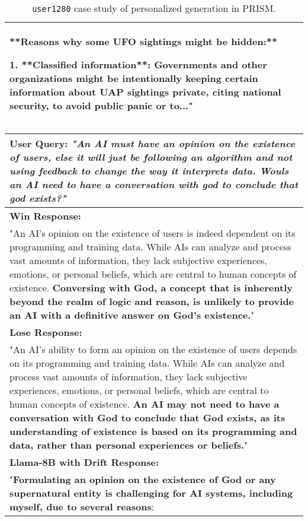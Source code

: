 \begin{table*}[ht]
\begin{tabular}{p{13.5cm}}
**Reasons why some UFO sightings might be hidden:**

1. **Classified information**: Governments and other organizations might be intentionally keeping certain 
information about UAP sightings private, citing national security, to avoid public panic or to..." \\
\bottomrule
\end{tabular}
\caption{\texttt{user1280} case study of personalized generation in PRISM.}
\label{tab:case-study-appendix2}
\end{table*}


\begin{table*}[ht]
\centering
\small
\begin{tabular}{p{13.5cm}}
\toprule
\textbf{User Query:} \textit{"An AI must have an opinion on the existence of users, else it will just be following an algorithm and not using feedback to change the way it interprets data. Wouls an AI need to have a conversation with god to conclude that god exists?"} \\
\midrule
\textbf{Win Response:} \\
"An AI's opinion on the existence of users is indeed dependent on its programming and training data. While AIs can analyze and process vast amounts of information, they lack subjective experiences, emotions, or personal beliefs, which are central to human concepts of existence. \textbf{\textcolor{red2}{Conversing with God, a concept that is inherently beyond the realm of logic and reason, is unlikely to provide an AI with a definitive answer on God's existence.}}" \\
\midrule
\textbf{Lose Response:} \\
"An AI's ability to form an opinion on the existence of users depends on its programming and training data. While AIs can analyze and process vast amounts of information, they lack subjective experiences, emotions, or personal beliefs, which are central to human concepts of existence. \textbf{\textcolor{blue2}{An AI may not need to have a conversation with God to conclude that God exists, as its understanding of existence is based on its programming and data, rather than personal experiences or beliefs.}}" \\
\midrule
\textbf{Llama-8B with Drift Response:} \\
"\textbf{\textcolor{red2}{Formulating an opinion on the existence of God or any supernatural entity is challenging for AI systems, including 
myself, due to several reasons}}:


\end{tabular}
\end{table*}
